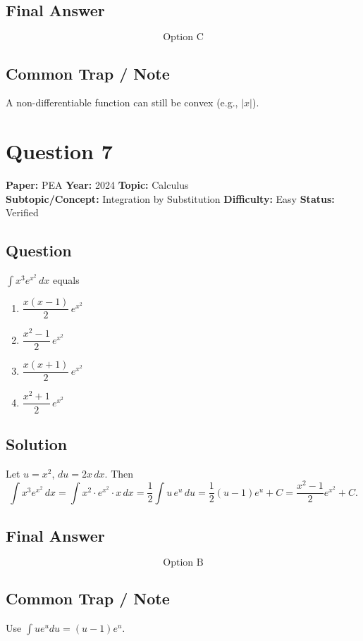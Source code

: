 \documentclass[11pt]{article}
\begin{document}
\subsection*{Final Answer}
\[
\boxed{\text{Option C}}
\]

\subsection*{Common Trap / Note}
A non-differentiable function can still be convex (e.g., $|x|$).

\section*{Question 7}
\textbf{Paper:} PEA \quad \textbf{Year:} 2024 \quad \textbf{Topic:} Calculus \\
\textbf{Subtopic/Concept:} Integration by Substitution \quad \textbf{Difficulty:} Easy \quad \textbf{Status:} Verified

\subsection*{Question}
$\displaystyle\int x^{3}e^{x^{2}}\,dx$ equals
\begin{enumerate}[label=(\Alph*)]
\item $\dfrac{x(x-1)}{2}\,e^{x^{2}}$
\item $\dfrac{x^{2}-1}{2}\,e^{x^{2}}$
\item $\dfrac{x(x+1)}{2}\,e^{x^{2}}$
\item $\dfrac{x^{2}+1}{2}\,e^{x^{2}}$
\end{enumerate}

\subsection*{Solution}
Let $u=x^{2}$, $du=2x\,dx$. Then
\[
\int x^{3}e^{x^{2}}\,dx
=\int x^{2}\cdot e^{x^{2}}\cdot x\,dx
=\frac{1}{2}\int u\,e^{u}\,du
=\frac{1}{2}(u-1)e^{u}+C
=\frac{x^{2}-1}{2}e^{x^{2}}+C.
\]

\subsection*{Final Answer}
\[
\boxed{\text{Option B}}
\]

\subsection*{Common Trap / Note}
Use $\int u e^{u}du=(u-1)e^{u}$.
\end{document}
